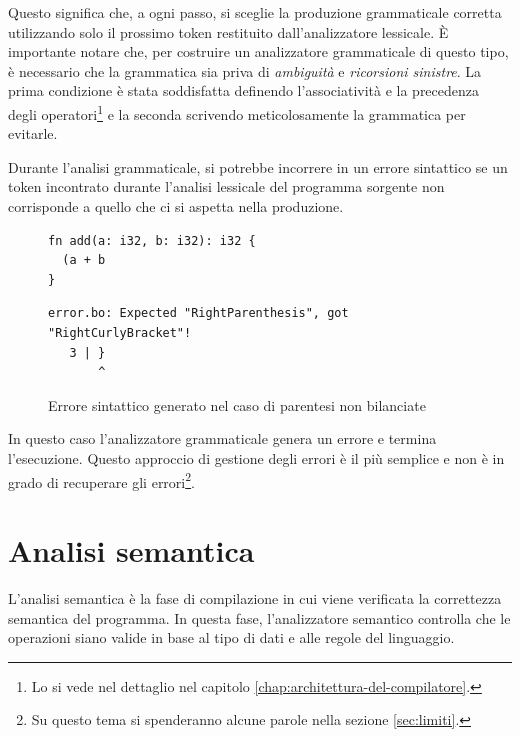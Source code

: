 Questo significa che, a ogni passo, si sceglie la produzione grammaticale corretta utilizzando solo il prossimo token restituito dall'analizzatore lessicale. \`E importante notare che, per costruire un analizzatore grammaticale di questo tipo, \`e necessario che la grammatica sia priva di \emph{ambiguit\`a} e \emph{ricorsioni sinistre}. La prima condizione \`e stata soddisfatta definendo l'associativit\`a e la precedenza degli operatori\footnote{Lo si vede nel dettaglio nel capitolo \ref{chap:architettura-del-compilatore}.} e la seconda scrivendo meticolosamente la grammatica per evitarle.

Durante l'analisi grammaticale, si potrebbe incorrere in un errore sintattico se un token incontrato durante l'analisi lessicale del programma sorgente non corrisponde a quello che ci si aspetta nella produzione.
\begin{figure}[H]
	\centering
	\begin{verbatim}
fn add(a: i32, b: i32): i32 {
  (a + b
}
	\end{verbatim}
	\begin{verbatim}
error.bo: Expected "RightParenthesis", got "RightCurlyBracket"!
   3 | }
       ^
	\end{verbatim}
	\label{fig:bugginout-syntax-error}
	\caption{Errore sintattico generato nel caso di parentesi non bilanciate}
\end{figure}
In questo caso l'analizzatore grammaticale genera un errore e termina l'esecuzione. Questo approccio di gestione degli errori \`e il pi\`u semplice e non \`e in grado di recuperare gli errori\footnote{Su questo tema si spenderanno alcune parole nella sezione \ref{sec:limiti}.}.

\section{Analisi semantica}
\label{sec:analisi-semantica}

L'analisi semantica \`e la fase di compilazione in cui viene verificata la correttezza semantica del programma. In questa fase, l'analizzatore semantico controlla che le operazioni siano valide in base al tipo di dati e alle regole del linguaggio.

